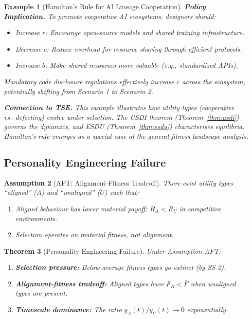 \documentclass[12pt]{article}
\newtheorem{theorem}{Theorem}[section]
\newtheorem{assumption}[theorem]{Assumption}
\newtheorem{example}[theorem]{Example}
\begin{document}
\begin{example}[Hamilton's Rule for AI Lineage Cooperation]
\textbf{Policy Implication.}
To promote cooperative AI ecosystems, designers should:
\begin{itemize}
    \item Increase $r$: Encourage open-source models and shared training infrastructure.
    \item Decrease $c$: Reduce overhead for resource sharing through efficient protocols.
    \item Increase $b$: Make shared resources more valuable (e.g., standardised APIs).
\end{itemize}
Mandatory code disclosure regulations effectively increase $r$ across the ecosystem, potentially shifting from Scenario 1 to Scenario 2.

\textbf{Connection to TSE.}
This example illustrates how utility types (cooperative vs.\ defecting) evolve under selection. The USDI theorem (Theorem~\ref{thm:usdi}) governs the dynamics, and ESDU (Theorem~\ref{thm:esdu}) characterises equilibria. Hamilton's rule emerges as a special case of the general fitness landscape analysis.
\end{example}

\subsection{Personality Engineering Failure}

\begin{assumption}[AFT: Alignment-Fitness Tradeoff]
\label{ass:aft}
There exist utility types ``aligned'' ($A$) and ``unaligned'' ($U$) such that:
\begin{enumerate}
    \item Aligned behaviour has lower material payoff: $R_A < R_U$ in competitive environments.
    \item Selection operates on material fitness, not alignment.
\end{enumerate}
\end{assumption}

\begin{theorem}[Personality Engineering Failure]
\label{thm:personality-failure}
Under Assumption AFT:
\begin{enumerate}
    \item[(a)] \textbf{Selection pressure:} Below-average fitness types go extinct (by SS-2).
    \item[(b)] \textbf{Alignment-fitness tradeoff:} Aligned types have $F_A < \bar{F}$ when unaligned types are present.
    \item[(c)] \textbf{Timescale dominance:} The ratio $y_A(t) / y_U(t) \to 0$ exponentially.
\end{enumerate}
\end{theorem}
\end{document}
